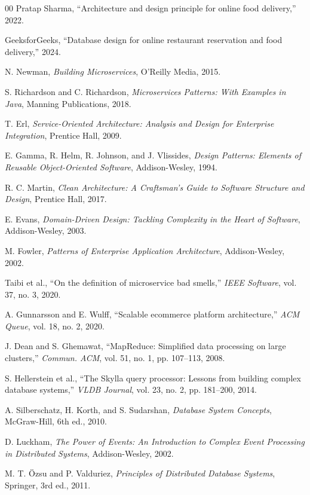 \documentclass[conference]{IEEEtran}
\begin{document}
\begin{thebibliography}{00}
 Pratap Sharma, ``Architecture and design principle for online food delivery,'' 2022.

 GeeksforGeeks, ``Database design for online restaurant reservation and food delivery,'' 2024.

 N. Newman, \textit{Building Microservices}, O'Reilly Media, 2015.

 S. Richardson and C. Richardson, \textit{Microservices Patterns: With Examples in Java}, Manning Publications, 2018.

 T. Erl, \textit{Service-Oriented Architecture: Analysis and Design for Enterprise Integration}, Prentice Hall, 2009.

 E. Gamma, R. Helm, R. Johnson, and J. Vlissides, \textit{Design Patterns: Elements of Reusable Object-Oriented Software}, Addison-Wesley, 1994.

 R. C. Martin, \textit{Clean Architecture: A Craftsman's Guide to Software Structure and Design}, Prentice Hall, 2017.

 E. Evans, \textit{Domain-Driven Design: Tackling Complexity in the Heart of Software}, Addison-Wesley, 2003.

 M. Fowler, \textit{Patterns of Enterprise Application Architecture}, Addison-Wesley, 2002.

 Taibi et al., ``On the definition of microservice bad smells,'' \textit{IEEE Software}, vol. 37, no. 3, 2020.

 A. Gunnarsson and E. Wulff, ``Scalable ecommerce platform architecture,'' \textit{ACM Queue}, vol. 18, no. 2, 2020.

 J. Dean and S. Ghemawat, ``MapReduce: Simplified data processing on large clusters,'' \textit{Commun. ACM}, vol. 51, no. 1, pp. 107--113, 2008.

 S. Hellerstein et al., ``The Skylla query processor: Lessons from building complex database systems,'' \textit{VLDB Journal}, vol. 23, no. 2, pp. 181--200, 2014.

 A. Silberschatz, H. Korth, and S. Sudarshan, \textit{Database System Concepts}, McGraw-Hill, 6th ed., 2010.

 D. Luckham, \textit{The Power of Events: An Introduction to Complex Event Processing in Distributed Systems}, Addison-Wesley, 2002.

 M. T. Özsu and P. Valduriez, \textit{Principles of Distributed Database Systems}, Springer, 3rd ed., 2011.


\end{thebibliography}
\end{document}
